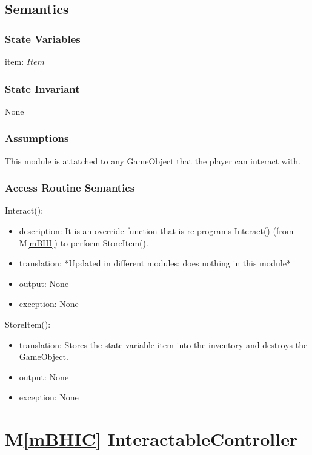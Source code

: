 \documentclass[12pt]{article}
\newcommand{\mref}[1]{M\ref{#1}}
\begin{document}
\subsection* {Semantics}

\subsubsection* {State Variables}

item: $Item$

\subsubsection* {State Invariant}

None

\subsubsection* {Assumptions}

This module is attatched to any GameObject that the player can interact with. 

\newpage

\subsubsection* {Access Routine Semantics}

\noindent Interact():
\begin{itemize}
\item description: It is an override function that is re-programs Interact() (from \mref{mBHI}) to perform StoreItem().
\item translation: *Updated in different modules; does nothing in this module*
\item output: None
\item exception: None
\end{itemize}

\noindent StoreItem():
\begin{itemize}
\item translation: Stores the state variable item into the inventory and destroys the GameObject.
\item output: None
\item exception: None
\end{itemize}

\newpage

\section* {\mref{mBHIC} InteractableController}
\end{document}
